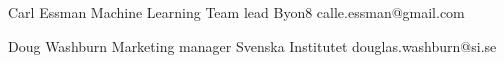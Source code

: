 %
%
%


\begin{referees}
		{Carl Essman}
		{Machine Learning Team lead}
		{Byon8}
		{calle.essman@gmail.com}

		{Doug Washburn}
		{Marketing manager}
		{Svenska Institutet}
		{douglas.washburn@si.se}

\end{referees}